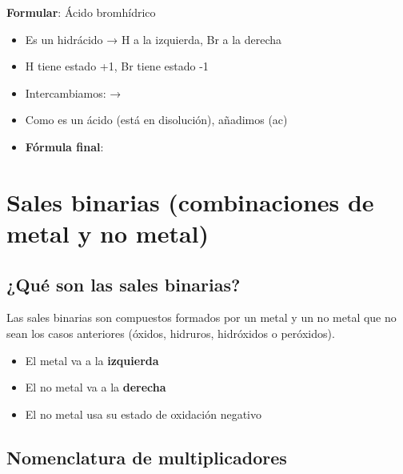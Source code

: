 \begin{example}
    \textbf{Formular}: Ácido bromhídrico

    \begin{itemize}
        \item Es un hidrácido → H a la izquierda, Br a la derecha
        \item H tiene estado +1, Br tiene estado -1
        \item Intercambiamos:  → 
        \item Como es un ácido (está en disolución), añadimos (ac)
        \item \textbf{Fórmula final}: 
    \end{itemize}
\end{example}


\section{Sales binarias (combinaciones de metal y no metal)}

\subsection{¿Qué son las sales binarias?}

Las sales binarias son compuestos formados por un metal y un no metal que no sean los casos anteriores (óxidos, hidruros, hidróxidos o peróxidos).

\begin{itemize}
    \item El metal va a la \textbf{izquierda}
    \item El no metal va a la \textbf{derecha}
    \item El no metal usa su estado de oxidación negativo
\end{itemize}

\subsection{Nomenclatura de multiplicadores}

